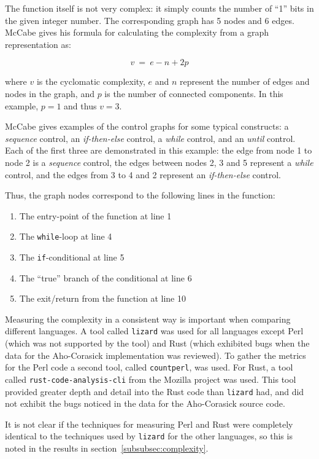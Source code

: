The function itself is not very complex: it simply counts the number of ``1'' bits in the given integer number. The corresponding graph has 5 nodes and 6 edges. McCabe gives his formula for calculating the complexity from a graph representation as:

\[v~=~e - n + 2p\]

where $v$ is the cyclomatic complexity, $e$ and $n$ represent the number of edges and nodes in the graph, and $p$ is the number of connected components. In this example, $p=1$ and thus $v=3$.

McCabe gives examples of the control graphs for some typical constructs: a \textit{sequence} control, an \textit{if-then-else} control, a \textit{while} control, and an \textit{until} control. Each of the first three are demonstrated in this example: the edge from node 1 to node 2 is a \textit{sequence} control, the edges between nodes 2, 3 and 5 represent a \textit{while} control, and the edges from 3 to 4 and 2 represent an \textit{if-then-else} control.

Thus, the graph nodes correspond to the following lines in the function:

\begin{enumerate}
\item The entry-point of the function at line 1
\item The \texttt{while}-loop at line 4
\item The \texttt{if}-conditional at line 5
\item The ``true'' branch of the conditional at line 6
\item The exit/return from the function at line 10
\end{enumerate}

Measuring the complexity in a consistent way is important when comparing different languages. A tool called \texttt{lizard} was used for all languages except Perl (which was not supported by the tool) and Rust (which exhibited bugs when the data for the Aho-Corasick implementation was reviewed). To gather the metrics for the Perl code a second tool, called \texttt{countperl}, was used. For Rust, a tool called \texttt{rust-code-analysis-cli} from the Mozilla project was used. This tool provided greater depth and detail into the Rust code than \texttt{lizard} had, and did not exhibit the bugs noticed in the data for the Aho-Corasick source code.

It is not clear if the techniques for measuring Perl and Rust were completely identical to the techniques used by \texttt{lizard} for the other languages, so this is noted in the results in section~\ref{subsubsec:complexity}.

